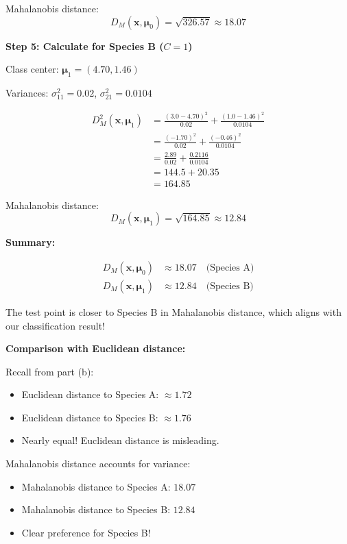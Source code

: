 \documentclass[12pt]{article}
\begin{document}
\begin{solution}
Mahalanobis distance:
\[
D_M(\mathbf{x}, \boldsymbol{\mu}_0) = \sqrt{326.57} \approx 18.07
\]

\textbf{Step 5: Calculate for Species B ($C = 1$)}

Class center: $\boldsymbol{\mu}_1 = (4.70, 1.46)$

Variances: $\sigma_{11}^2 = 0.02$, $\sigma_{21}^2 = 0.0104$

\begin{align}
D_M^2(\mathbf{x}, \boldsymbol{\mu}_1) &= \frac{(3.0 - 4.70)^2}{0.02} + \frac{(1.0 - 1.46)^2}{0.0104} \\
&= \frac{(-1.70)^2}{0.02} + \frac{(-0.46)^2}{0.0104} \\
&= \frac{2.89}{0.02} + \frac{0.2116}{0.0104} \\
&= 144.5 + 20.35 \\
&= 164.85
\end{align}

Mahalanobis distance:
\[
D_M(\mathbf{x}, \boldsymbol{\mu}_1) = \sqrt{164.85} \approx 12.84
\]

\textbf{Summary:}

\[
\boxed{
\begin{aligned}
D_M(\mathbf{x}, \boldsymbol{\mu}_0) &\approx 18.07 \quad \text{(Species A)} \\
D_M(\mathbf{x}, \boldsymbol{\mu}_1) &\approx 12.84 \quad \text{(Species B)}
\end{aligned}
}
\]

The test point is closer to Species B in Mahalanobis distance, which aligns with our classification result!

\textbf{Comparison with Euclidean distance:}

Recall from part (b):
\begin{itemize}
    \item Euclidean distance to Species A: $\approx 1.72$
    \item Euclidean distance to Species B: $\approx 1.76$
    \item Nearly equal! Euclidean distance is misleading.
\end{itemize}

Mahalanobis distance accounts for variance:
\begin{itemize}
    \item Mahalanobis distance to Species A: $18.07$
    \item Mahalanobis distance to Species B: $12.84$
    \item Clear preference for Species B!
\end{itemize}
\end{solution}
\end{document}
